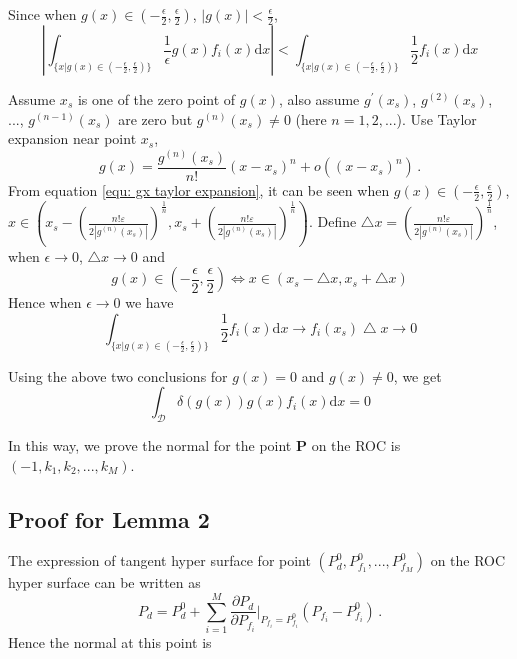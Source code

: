 \documentclass[12pt,journal,a4paper,twoside,doublecolumn]{IEEEtran}
\begin{document}
\begin{spacing}{1.0}
Since when $g(x) \in (-\frac{\epsilon}{2}, \frac{\epsilon}{2})$, $|g(x)| < \frac{\epsilon}{2}$,
\begin{equation}|
\int_{\{x|g(x)\in (-\frac{\epsilon}{2}, \frac{\epsilon}{2})\}} \frac{1}{\epsilon} g(x)f_i(x) \mathrm{d}x | <
\int_{\{x|g(x)\in (-\frac{\epsilon}{2}, \frac{\epsilon}{2})\}} \frac{1}{2}f_i(x) \mathrm{d}x
\end{equation}

Assume $x_s$ is one of the zero point of $g(x)$, also assume $g^\prime(x_s)$, $g^{(2)}(x_s)$, ..., $g^{(n-1)}(x_s)$ are zero but $g^{(n)}(x_s) \neq 0$ (here $n = 1, 2, ...$). Use Taylor expansion near point $x_s$,
\begin{equation}
  \label{equ: gx taylor expansion}
  g(x) = \frac{g^{(n)}(x_s)}{n!}(x - x_s)^n + o((x - x_s)^n)\,.
\end{equation}
\def \LEFT{ x_s
  -\left(\frac{n!\varepsilon}{2|g^{(n)}(x_s)|}\right)^{\frac{1}{n}}}
  \def \RIGHT{ x_s
  +\left(\frac{n!\varepsilon}{2|g^{(n)}(x_s)|}\right)^{\frac{1}{n}}}
From equation \eqref{equ: gx taylor expansion}, it can be seen when $g(x)\in (-\frac{\epsilon}{2}, \frac{\epsilon}{2})$, $x \in \left(
      \LEFT, \RIGHT
  \right)$.  Define $\bigtriangleup x = \left(\frac{n!\varepsilon}{2|g^{(n)}(x_s)|}\right)^{\frac{1}{n}}$, when $\epsilon \rightarrow 0$, $\bigtriangleup x \rightarrow 0$ and
\begin{equation}
\label{pro: scale}
g(x) \in (-\frac{\epsilon}{2}, \frac{\epsilon}{2})  \Leftrightarrow x \in (x_s -\bigtriangleup x, x_s + \bigtriangleup x)
\end{equation}
 Hence when $\epsilon \rightarrow 0$ we have
\begin{equation}
\int_{\{x|g(x)\in (-\frac{\epsilon}{2}, \frac{\epsilon}{2})\}} \frac{1}{2}f_i(x) \mathrm{d}x \rightarrow
f_i(x_s)\bigtriangleup x \rightarrow 0
\end{equation}

Using the above two conclusions for $g(x) = 0$ and $g(x) \neq 0$, we get
\begin{equation}
\int_{\mathcal{D}} \delta (g(x)) g(x)f_i(x) \mathrm{d}x = 0
\end{equation}

In this way, we prove the normal for the point \textbf{P} on the ROC is $(-1, k_1, k_2, ..., k_M)$.

\subsection{Proof for Lemma 2}
The expression of tangent hyper surface for point $(P_d^0, P_{f_1}^0, ..., P_{f_M}^0)$ on the ROC hyper surface can be written as
\begin{equation}
P_d = P_d^0 + \sum_{i=1}^{M} \frac{\partial P_d}{\partial P_{f_i}}\bigg|_{P_{f_i} = P_{f_i}^0}(P_{f_i} - P_{f_i}^0)\,.
\end{equation}
Hence the normal at this point is


\end{spacing}
\end{document}
